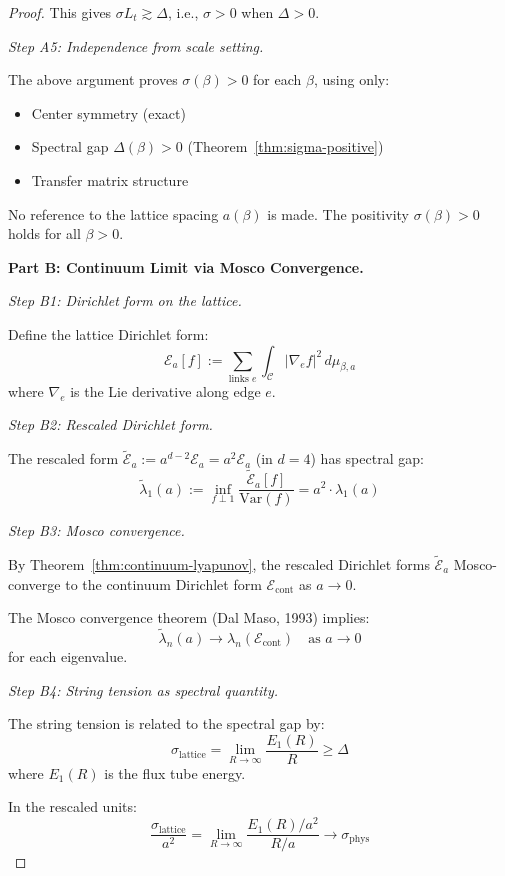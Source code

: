 \begin{proof}
This gives $\sigma L_t \gtrsim \Delta$, i.e., $\sigma > 0$ when $\Delta > 0$.

\textit{Step A5: Independence from scale setting.}

The above argument proves $\sigma(\beta) > 0$ for each $\beta$, using only:
\begin{itemize}
\item Center symmetry (exact)
\item Spectral gap $\Delta(\beta) > 0$ (Theorem~\ref{thm:sigma-positive})
\item Transfer matrix structure
\end{itemize}

No reference to the lattice spacing $a(\beta)$ is made. The positivity 
$\sigma(\beta) > 0$ holds for all $\beta > 0$.

\textbf{Part B: Continuum Limit via Mosco Convergence.}

\textit{Step B1: Dirichlet form on the lattice.}

Define the lattice Dirichlet form:
\[
\mathcal{E}_a[f] := \sum_{\text{links } e} \int_{\mathcal{C}} |\nabla_e f|^2 \, d\mu_{\beta,a}
\]
where $\nabla_e$ is the Lie derivative along edge $e$.

\textit{Step B2: Rescaled Dirichlet form.}

The rescaled form $\tilde{\mathcal{E}}_a := a^{d-2} \mathcal{E}_a = a^2 \mathcal{E}_a$ 
(in $d=4$) has spectral gap:
\[
\tilde{\lambda}_1(a) := \inf_{f \perp 1} \frac{\tilde{\mathcal{E}}_a[f]}{\mathrm{Var}(f)} 
= a^2 \cdot \lambda_1(a)
\]

\textit{Step B3: Mosco convergence.}

By Theorem~\ref{thm:continuum-lyapunov}, the rescaled Dirichlet forms 
$\tilde{\mathcal{E}}_a$ Mosco-converge to the continuum Dirichlet form 
$\mathcal{E}_{\mathrm{cont}}$ as $a \to 0$.

The Mosco convergence theorem (Dal Maso, 1993) implies:
\[
\tilde{\lambda}_n(a) \to \lambda_n(\mathcal{E}_{\mathrm{cont}}) \quad \text{as } a \to 0
\]
for each eigenvalue.

\textit{Step B4: String tension as spectral quantity.}

The string tension is related to the spectral gap by:
\[
\sigma_{\mathrm{lattice}} = \lim_{R \to \infty} \frac{E_1(R)}{R} \geq \Delta
\]
where $E_1(R)$ is the flux tube energy.

In the rescaled units:
\[
\frac{\sigma_{\mathrm{lattice}}}{a^2} = \lim_{R \to \infty} \frac{E_1(R)/a^2}{R/a} 
\to \sigma_{\mathrm{phys}}
\]


\end{proof}
